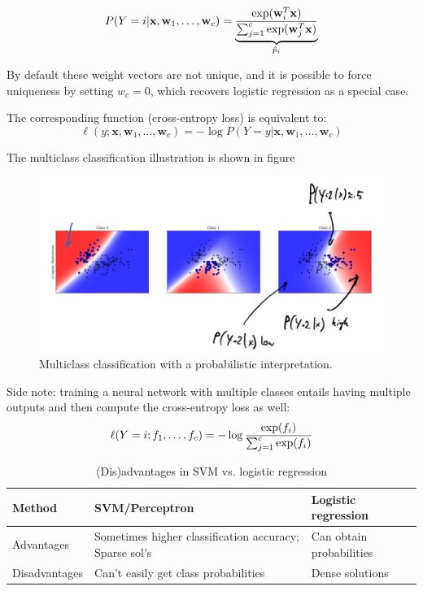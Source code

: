\documentclass[a4paper,10pt,twoside]{article}
\begin{document}
\begin{equation*}
  P(Y=i|\mathbf{x}, \mathbf{w}_1, \ldots, \mathbf{w}_c) = \underbrace{{\exp(\mathbf{w}_i^T\mathbf{x})\over \sum_{j=1}^{c}\exp(\mathbf{w}_j^T\mathbf{x})}}_{\hat{p}_i}
\end{equation*}

By default these weight vectors are not unique, and it is possible to force uniqueness by setting $w_c=0$, which recovers logistic regression as a special case.

The corresponding function (cross-entropy loss) is equivalent to:
\begin{equation*}
  \ell(y;\mathbf{x}, \mathbf{w}_1,\ldots,\mathbf{w}_c)=-\log P(Y=y|\mathbf{x}, \mathbf{w}_1, \ldots, \mathbf{w}_c)
\end{equation*}

The multiclass classification illustration is shown in figure

\begin{figure}
  \centering
  \includegraphics[width=.5\textwidth]{figures/multiclass-classification-probabilistic-interpretation.png}
  \caption{Multiclass classification with a probabilistic interpretation.}
  \label{fig:multiclass-classification-probabilistic-interpretation}
\end{figure}

Side note: training a neural network with multiple classes entails having multiple outputs and then compute the cross-entropy loss as well:
\begin{equation*}
  \ell(Y=i;f_1,\ldots, f_c) = -\log{\exp (f_i)\over \sum_{j=1}^{c}\exp(f_i)}
\end{equation*}

\begin{table}
  \centering
  \begin{tabular}{lll}
    \toprule
    Method & SVM/Perceptron & Logistic regression\\
    \midrule
    Advantages & Sometimes higher classification accuracy; Sparse sol's & Can obtain probabilities\\
    Disadvantages & Can't easily get class probabilities & Dense solutions\\
    \bottomrule
  \end{tabular}
  \caption{(Dis)advantages in SVM vs. logistic regression}
\end{table}
\end{document}
